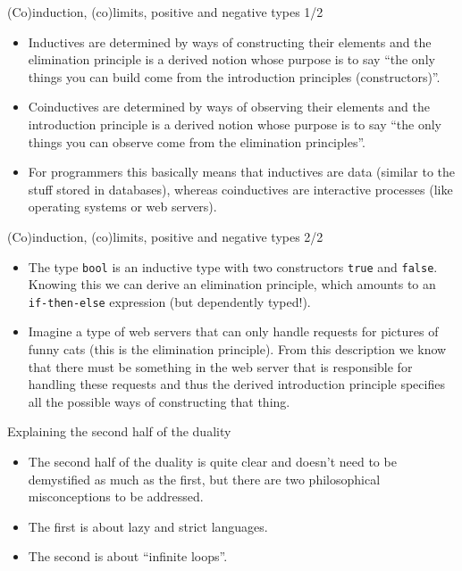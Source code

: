\documentclass{beamer}
\begin{document}
\begin{frame}{(Co)induction, (co)limits, positive and negative types 1/2}
\begin{itemize}
	\item Inductives are determined by ways of constructing their elements and the elimination principle is a derived notion whose purpose is to say ``the only things you can build come from the introduction principles (constructors)''.
	\item Coinductives are determined by ways of observing their elements and the introduction principle is a derived notion whose purpose is to say ``the only things you can observe come from the elimination principles''.
	\item For programmers this basically means that inductives are data (similar to the stuff stored in databases), whereas coinductives are interactive processes (like operating systems or web servers).
\end{itemize}
\end{frame}

\begin{frame}{(Co)induction, (co)limits, positive and negative types 2/2}
\begin{itemize}
	\item The type \texttt{bool} is an inductive type with two constructors \texttt{true} and \texttt{false}. Knowing this we can derive an elimination principle, which amounts to an \texttt{if-then-else} expression (but dependently typed!).
	\item Imagine a type of web servers that can only handle requests for pictures of funny cats (this is the elimination principle). From this description we know that there must be something in the web server that is responsible for handling these requests and thus the derived introduction principle specifies all the possible ways of constructing that thing.
\end{itemize}
\end{frame}

\begin{frame}{Explaining the second half of the duality}
\begin{itemize}
	\item The second half of the duality is quite clear and doesn't need to be demystified as much as the first, but there are two philosophical misconceptions to be addressed.
	\item The first is about lazy and strict languages.
	\item The second is about ``infinite loops''.
\end{itemize}
\end{frame}
\end{document}
